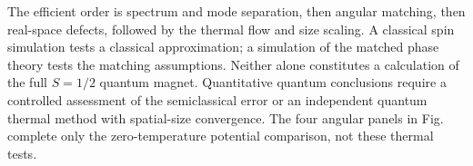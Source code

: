 The efficient order is spectrum and mode separation, then angular
matching, then real-space defects, followed by the thermal flow and size
scaling. A classical spin simulation tests a classical approximation; a
simulation of the matched phase theory tests the matching assumptions.
Neither alone constitutes a calculation of the full \(S=1/2\) quantum
magnet. Quantitative quantum conclusions require a controlled assessment
of the semiclassical error or an independent quantum thermal method with
spatial-size convergence. The four angular panels in
Fig.~ complete only the zero-temperature potential
comparison, not these thermal tests.

